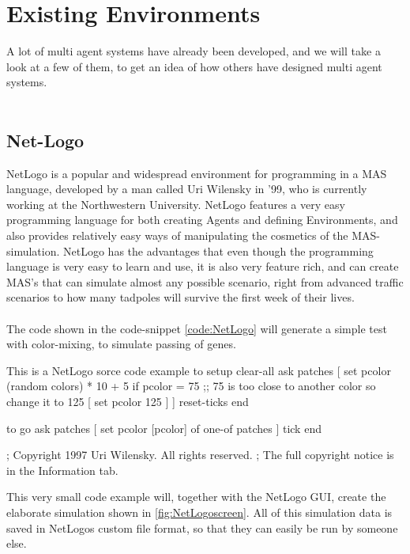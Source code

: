 \chapter{Existing Environments}

A lot of multi agent systems have already been developed, and we will take a look at a few of them, to get an idea of how others have designed multi agent systems.\\
\\
\section{Net-Logo}
NetLogo is a popular and widespread environment for programming in a MAS language, developed by a man called Uri Wilensky in '99, who is currently working at the Northwestern University. \cite{misc:northwestern}
\indent NetLogo features a very easy programming language for both creating Agents and defining Environments, and also provides relatively easy ways of manipulating the cosmetics of the MAS-simulation. NetLogo has the advantages that even though the programming language is very easy to learn and use, it is also very feature rich, and can create MAS's that can simulate almost any possible scenario, right from advanced traffic scenarios to how many tadpoles will survive the first week of their lives. \\
\\
The code shown in the code-snippet \ref{code:NetLogo} will generate a simple test with color-mixing, to simulate passing of genes.

\begin{NetLogo}{This is a NetLogo sorce code example \label{code:NetLogo}}{}
to setup
  clear-all
  ask patches
    [ set pcolor (random colors) * 10 + 5
        if pcolor = 75  ;; 75 is too close to another color so change it to 125
          [ set pcolor 125 ] ]
  reset-ticks
end

to go
  ask patches [ set pcolor [pcolor] of one-of patches ]
  tick
end


; Copyright 1997 Uri Wilensky. All rights reserved.
; The full copyright notice is in the Information tab.
\end{NetLogo}

This very small code example will, together with the NetLogo GUI, create the elaborate simulation shown in \ref{fig:NetLogoscreen}. All of this simulation data is saved in NetLogos custom file format, so that they can easily be run by someone else.

